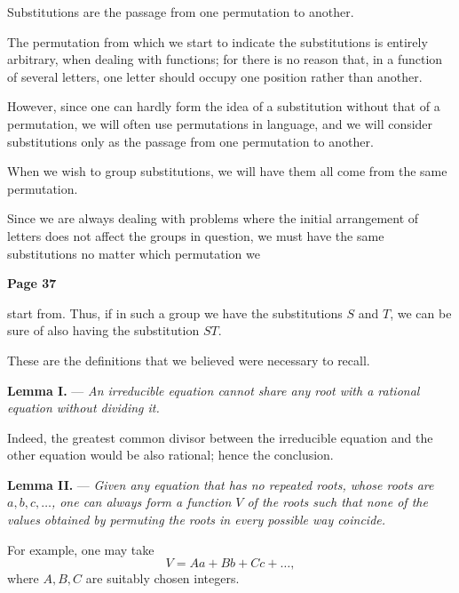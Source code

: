 \documentclass{article}
\begin{document}
Substitutions are the passage from one permutation to another.

\smallskip

The permutation from which we start to indicate the substitutions is entirely arbitrary, when dealing with functions; for there is no reason that, in a function of several letters, one letter should occupy one position rather than another.

\smallskip

However, since one can hardly form the idea of a substitution without that of a permutation, we will often use permutations in language, and we will consider substitutions only as the passage from one permutation to another.

\smallskip

When we wish to group substitutions, we will have them all come from the same permutation.

\smallskip

Since we are always dealing with problems where the initial arrangement of letters does not affect the groups in question, we must have the same substitutions no matter which permutation we


\newpage

\centerline{\textbf{Page 37}}

\medskip

start from. Thus, if in such a group we have the substitutions \(S\) and \(T\), we can be sure of also having the substitution \(ST\). 

These are the definitions that we believed were necessary to recall.

\smallskip


\textbf{Lemma I.} --- \textit{An irreducible equation cannot share any root with a rational equation without dividing it.}

\smallskip

Indeed, the greatest common divisor between the irreducible equation and the other equation would be also rational; hence the conclusion.

\smallskip


\textbf{Lemma II.} --- \textit{Given any equation that has no repeated roots, whose roots are \(a, b, c, \dots\), one can always form a function \(V\) of the roots such that none of the values obtained by permuting the roots in every possible way coincide.}

\smallskip

For example, one may take
\[
V = Aa + Bb + Cc + \dots,
\]
where \(A, B, C\) are suitably chosen integers.
\end{document}
